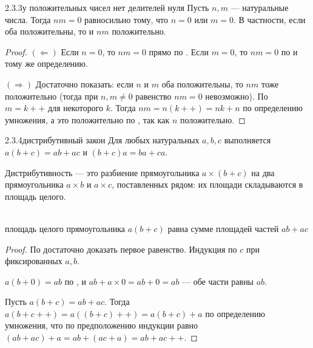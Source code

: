 \begin{lemma}{2.3.3}{у положительных чисел нет делителей нуля}
Пусть $n,m$ — натуральные числа. Тогда $nm=0$ равносильно тому, что $n=0$ или $m=0$. В
частности, если оба положительны, то и $nm$ положительно.
\end{lemma}

\begin{proof}
$(\Leftarrow)$ Если $n=0$, то $nm=0$ прямо по . Если
$m=0$, то $nm=0$ по  и тому же определению.

$(\Rightarrow)$ Достаточно показать: если $n$ и $m$ оба положительны, то $nm$ тоже
положительно (тогда при $n,m\neq0$ равенство $nm=0$ невозможно). По
 $m = k{+}{+}$ для некоторого $k$. Тогда
$nm = n(k{+}{+}) = nk+n$ по определению умножения, а это положительно по
, так как $n$ положительно.
\end{proof}

\begin{proposition}{2.3.4}{дистрибутивный закон}
Для любых натуральных $a,b,c$ выполняется $a(b+c)=ab+ac$ и $(b+c)a=ba+ca$.
\end{proposition}

\begin{intuition}
Дистрибутивность — это разбиение прямоугольника $a \times (b+c)$ на два прямоугольника
$a \times b$ и $a \times c$, поставленных рядом: их площади складываются в площадь целого.

\begin{center}
\\
{\footnotesize\color{intuitiongray}площадь целого прямоугольника $a(b+c)$ равна сумме
площадей частей $ab+ac$}
\end{center}
\end{intuition}

\begin{proof}
По  достаточно доказать первое равенство. Индукция по
$c$ при фиксированных $a,b$.

 $a(b+0)=ab$ по , и $ab+a \times 0=ab+0=ab$
— обе части равны $ab$.

 Пусть $a(b+c)=ab+ac$. Тогда $a(b+c{+}{+})=a((b+c){+}{+})=a(b+c)+a$ по
определению умножения, что по предположению индукции равно $(ab+ac)+a=ab+(ac+a)=ab+ac{+}{+}$.
\end{proof}


